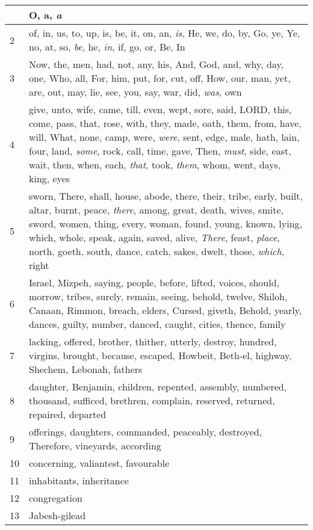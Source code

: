 \begin{longtable}{l|p{3.75in}}
\hline \hline
\endlastfoot
1 & O, a, \emph{a} \\ \hline
2 & of, in, us, to, up, is, be, it, on, an, \emph{is}, He, we, do, by, Go, ye, Ye, no, at, so, \emph{be}, he, \emph{in}, if, go, or, Be, In \\ \hline
3 & Now, the, men, had, not, any, his, And, God, and, why, day, one, Who, all, For, him, put, for, cut, off, How, our, man, yet, are, out, may, lie, see, you, say, war, did, \emph{was}, own \\ \hline
4 & give, unto, wife, came, till, even, wept, sore, said, LORD, this, come, pass, that, rose, with, they, made, oath, them, from, have, will, What, none, camp, were, \emph{were}, sent, edge, male, hath, lain, four, land, \emph{some}, rock, call, time, gave, Then, \emph{must}, side, east, wait, then, when, each, \emph{that}, took, \emph{them}, whom, went, days, king, eyes \\ \hline
5 & sworn, There, shall, house, abode, there, their, tribe, early, built, altar, burnt, peace, \emph{there}, among, great, death, wives, smite, sword, women, thing, every, woman, found, young, known, lying, which, whole, speak, again, saved, alive, \emph{There}, feast, \emph{place}, north, goeth, south, dance, catch, sakes, dwelt, those, \emph{which}, right \\ \hline
6 & Israel, Mizpeh, saying, people, before, lifted, voices, should, morrow, tribes, surely, remain, seeing, behold, twelve, Shiloh, Canaan, Rimmon, breach, elders, Cursed, giveth, Behold, yearly, dances, guilty, number, danced, caught, cities, thence, family \\ \hline
7 & lacking, offered, brother, thither, utterly, destroy, hundred, virgins, brought, because, escaped, Howbeit, Beth-el, highway, Shechem, Lebonah, fathers \\ \hline
8 & daughter, Benjamin, children, repented, assembly, numbered, thousand, sufficed, brethren, complain, reserved, returned, repaired, departed \\ \hline
9 & offerings, daughters, commanded, peaceably, destroyed, Therefore, vineyards, according \\ \hline
10 & concerning, valiantest, favourable \\ \hline
11 & inhabitants, inheritance \\ \hline
12 & congregation \\ \hline
13 & Jabesh-gilead \\ \hline
\end{longtable}






